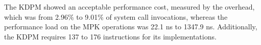   The KDPM showed an acceptable performance cost, measured by the overhead, which 
  was from 2.96\% to 9.01\% of system call invocations, whereas the performance load
  on the MPK operations was 22.1 ns to 1347.9 ns.
  Additionally, the KDPM requires 137 to 176 instructions for its
  implementations.




